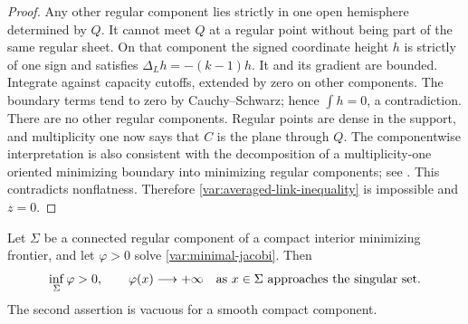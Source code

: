 \begin{proof}
Any other regular component lies strictly in one open hemisphere
determined by $Q$.  It cannot meet $Q$ at a regular point without
being part of the same regular sheet.  On that component the signed
coordinate height $h$ is strictly of one sign and satisfies
$\Delta_Lh=-(k-1)h$.  It and its gradient are bounded.  Integrate
against capacity cutoffs, extended by zero on other components.
The boundary terms tend to zero by Cauchy--Schwarz; hence
$\int h=0$, a contradiction.  There are no other regular
components.  Regular points are dense in the support, and
multiplicity one now says that $C$ is the plane through $Q$.
The componentwise interpretation is also consistent with the
decomposition of a multiplicity-one oriented minimizing boundary
into minimizing regular components; see
\cite[Chapter~7, Section~5, Corollary~5.11 and Remark~5.12]{SimonGMT2014}.
This contradicts nonflatness.  Therefore
\eqref{var:averaged-link-inequality} is impossible and $z=0$.
\end{proof}

\begin{lemma}\label{var:reciprocal-jacobi}
Let $\Sigma$ be a connected regular component of a compact interior
minimizing frontier, and let $\varphi>0$ solve
\eqref{var:minimal-jacobi}.  Then
\begin{equation}\label{var:Jacobi-singular-behavior}
 \inf_\Sigma\varphi>0,
 \qquad
 \varphi(x)\longrightarrow+\infty
 \quad\hbox{as }x\in\Sigma\hbox{ approaches the singular set}.
\end{equation}
The second assertion is vacuous for a smooth compact component.
\end{lemma}

